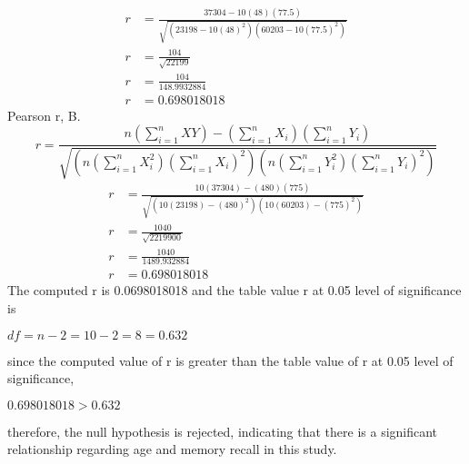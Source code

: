 \documentclass{article}
\begin{document}
    \begin{align*}
        r&=\frac{37304-10(48)(77.5)}{\sqrt
        {(23198-10(48)^2)(60203-10(77.5)^2)}}\\
        r&=\frac{104}{\sqrt{22199}}\\
        r&=\frac{104}{148.9932884}\\
        r&=0.698018018
    \end{align*}
    \newpage
    Pearson r, B.
    \begin{equation}
        r=\frac{n(\sum_{i=1}^{n}XY)-(\sum_{i=1}^{n}X_i)(\sum_{i=1}^{n}Y_i)}{\sqrt{(n(\sum_{i=1}
        ^{n}X^2_i)(\sum_{i=1}^{n}X_i)^2)(n(\sum_{i=1}^{n}Y^2_i)(\sum_{i=1}^{n}Y_i)^2)}}
    \end{equation}
    \begin{align*}
        r&=\frac{10(37304)-(480)(775)}{\sqrt{(10(23198)-(480)^2)(10(60203)-(775)^2)}}\\
        r&=\frac{1040}{\sqrt{2219900}}\\
        r&=\frac{1040}{1489.932884}\\
        r&=0.698018018
    \end{align*}
    The computed r is 0.0698018018 and the table value r at 0.05 level of significance is 
    \begin{center}
        $df=n-2=10-2=8=0.632$
    \end{center}
    since the computed value of r is greater than the table value of r at 0.05 level of significance,
    \begin{center}
        $0.698018018 > 0.632$
    \end{center}
    therefore, the null hypothesis is rejected, indicating that there is a significant relationship regarding age and memory recall in this study.

    \newpage
\end{document}
